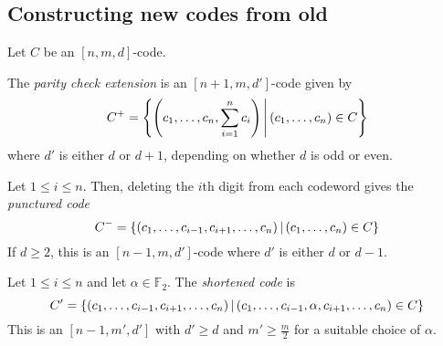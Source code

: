 \subsection{Constructing new codes from old}
Let \( C \) be an \( [n,m,d] \)-code.
\begin{example}
    The \emph{parity check extension} is an \( [n+1,m,d'] \)-code given by
    \[ C^+ = \qty{\qty(c_1, \dots, c_n, \sum_{i=1}^n c_i) \,\middle|\,(c_1, \dots, c_n) \in C} \]
    where \( d' \) is either \( d \) or \( d + 1 \), depending on whether \( d \) is odd or even.
\end{example}
\begin{example}
    Let \( 1 \leq i \leq n \).
    Then, deleting the \( i \)th digit from each codeword gives the \emph{punctured code}
    \[ C^- = \qty{(c_1, \dots, c_{i-1}, c_{i+1}, \dots, c_n) \,\middle|\,(c_1, \dots, c_n) \in C} \]
    If \( d \geq 2 \), this is an \( [n-1, m, d'] \)-code where \( d' \) is either \( d \) or \( d - 1 \).
\end{example}
\begin{example}
    Let \( 1 \leq i \leq n \) and let \( \alpha \in \mathbb F_2 \).
    The \emph{shortened code} is
    \[ C' = \qty{(c_1, \dots, c_{i-1}, c_{i+1}, \dots, c_n) \,\middle|\,(c_1, \dots, c_{i-1}, \alpha, c_{i+1}, \dots, c_n) \in C} \]
    This is an \( [n-1,m',d'] \) with \( d' \geq d \) and \( m' \geq \frac{m}{2} \) for a suitable choice of \( \alpha \).
\end{example}
